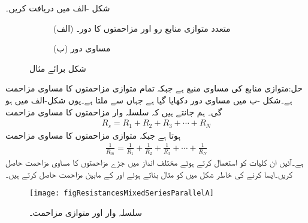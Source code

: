 شکل -الف میں  دریافت کریں۔ 
\begin{figure}
\centering
\begin{subfigure}{1\textwidth}
\centering
{}
\caption*{(الف) متعدد متوازی منابع رو اور مزاحمتوں کا دور۔}
\end{subfigure}
\begin{subfigure}{1\textwidth}
\centering
{}
\caption*{(ب) مساوی دور}
\end{subfigure}
\caption{شکل برائے مثال }
\label{شکل_مزاحمت_مثال_متوازی_منابع_رو_مزاحمت}
\end{figure}

حل:متوازی منابع کی مساوی منبع  ہے جبکہ تمام متوازی مزاحمتوں کا مساوی مزاحمت  ہے۔شکل -ب میں مساوی دور دکھایا گیا ہے جہاں سے  ملتا ہے۔یوں شکل-الف میں  ہو گی۔
ہم جانتے ہیں کہ سلسلہ وار مزاحمتوں کا مساوی مزاحمت
\begin{align}\label{مساوات_مزاحمتی_سلسلہ_وار_دوبارہ}
R_s=R_1+R_2+R_3+\cdots+R_N
\end{align}
ہوتا ہے جبکہ متوازی مزاحمتوں کا مساوی مزاحمت
\begin{align}\label{مساوات_مزاحمتی_متوازی_دوبارہ}
\frac{1}{R_m}=\frac{1}{R_1}+\frac{1}{R_2}+\frac{1}{R_3}+\cdots+\frac{1}{R_N}
\end{align}
ہے۔آئیں ان کلیات کو استعمال کرتے ہوئے مختلف انداز میں جڑے مزاحمتوں کا مساوی مزاحمت حاصل کریں۔ایسا کرنے کی خاطر شکل  میں کو مثال بناتے ہوئے  اور  کے مابین مزاحمت  حاصل کرتے ہیں۔
\begin{figure}
\centering
\texttt{[image: figResistancesMixedSeriesParallelA]}
\caption{سلسلہ وار اور متوازی مزاحمت۔}
\label{مشق_مزاحمتی_سلسلہ_وار_متوازی_مزاحمت}
\end{figure}

